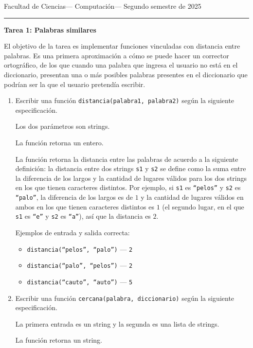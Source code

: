 \documentclass[a4paper,12pt]{book}
\theoremstyle{definition}
\begin{document}
	
	\noindent
	\centerline{\sc
		Facultad de Ciencias\hfill---\hfill
		Computación\hfill---\hfill
		Segundo semestre de 2025}\smallbreak\hrule
	
	\bigbreak
	\centerline{\Large\textbf{Tarea 1: Palabras similares}}
	\bigbreak
	
	El objetivo de la tarea es implementar funciones vinculadas con distancia entre palabras. Es una primera aproximación a cómo se puede hacer un corrector ortográfico, de los que cuando una palabra que ingresa el usuario no está en el diccionario, presentan una o más posibles palabras presentes en el diccionario que podrían ser la que el usuario pretendía escribir.
	
	\begin{enumerate}
		\item Escribir una función {\tt distancia(palabra1, palabra2)} según la siguiente especificación.
		
		Los dos parámetros son strings.
		
		La función retorna un entero.
		
		La función retorna la distancia entre las palabras de acuerdo a la siguiente definición: la distancia entre dos strings {\tt s1} y {\tt s2} se define como la suma entre la diferencia de los largos y la cantidad de lugares válidos para los dos strings en los que tienen caracteres distintos. Por ejemplo, si {\tt s1} es {\tt ``pelos''} y {\tt s2} es {\tt ``palo''}, la diferencia de los largos es de $1$ y la cantidad de lugares válidos en ambos en los que tienen caracteres distintos es $1$ (el segundo lugar, en el que {\tt s1} es {\tt ``e''} y {\tt s2} es {\tt ``a''}), así que la distancia es $2$.
		
		Ejemplos de entrada y salida correcta:
		\begin{itemize}\parskip-.5ex
			\item {\tt distancia(``pelos'', ``palo'')} --- {\tt 2}
			\item {\tt distancia(``palo'', ``pelos'')} --- {\tt 2}
			\item {\tt distancia(``cauto'', ``auto'')} --- {\tt 5}
		\end{itemize}
		
		\item Escribir una función {\tt cercana(palabra, diccionario)} según la siguiente especificación.
		
		La primera entrada es un string y la segunda es una lista de strings.
		
		La función retorna un string.
		

\end{enumerate}
\end{document}
